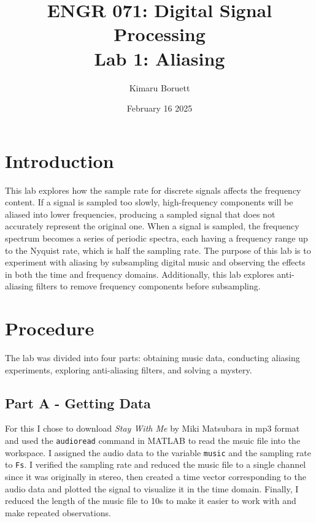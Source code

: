 \documentclass[12pt]{article}
\title{ENGR 071: Digital Signal Processing\\Lab 1: Aliasing}
\author{Kimaru Boruett}
\date{February 16 2025}
\newcommand{\code}[1]{\colorbox{gray!20}{\texttt{#1}}}
\begin{document}
\maketitle

\section{Introduction}
This lab explores how the sample rate for discrete signals affects the frequency content. If a signal is sampled too slowly, high-frequency components will be aliased into lower frequencies, producing a sampled signal that does not accurately represent the original one. When a signal is sampled, the frequency spectrum becomes a series of periodic spectra, each having a frequency range up to the Nyquist rate, which is half the sampling rate. The purpose of this lab is to experiment with aliasing by subsampling digital music and observing the effects in both the time and frequency domains. Additionally, this lab explores anti-aliasing filters to remove frequency components before subsampling.

\section{Procedure}
The lab was divided into four parts: obtaining music data, conducting aliasing experiments, exploring anti-aliasing filters, and solving a mystery. 
\subsection{Part A - Getting Data}
For this I chose to download \textit{Stay With Me} by Miki Matsubara in mp3 format and used the  \code{audioread} command in MATLAB to read the msuic file into the workspace. I assigned the audio data to the variable \code{music} and the sampling rate to \code{Fs}. I verified the sampling rate and reduced the music file to a single channel since it was originally in stereo, then created a time vector corresponding to the audio data and plotted the signal to visualize it in the time domain. Finally, I reduced the length of the music file to 10s to make it easier to work with and make repeated observations.
\end{document}

